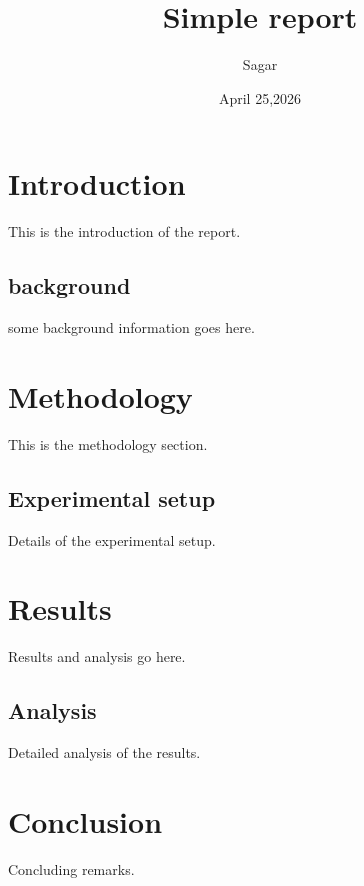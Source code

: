 \documentclass[a4 paper,12pt]{report}
\title{Simple report}
\author{Sagar}
\date{April 25,2026}
\begin{document}
\chapter{Introduction}
This is the introduction of the report.
\section{background}
some background information goes here.
\chapter{Methodology}
This is the methodology section.
\section{Experimental setup}
Details of the experimental setup.
\chapter{Results}
Results and analysis go here.
\section{Analysis}
Detailed analysis of the results.
\chapter{Conclusion}
Concluding remarks.
\end{document}
